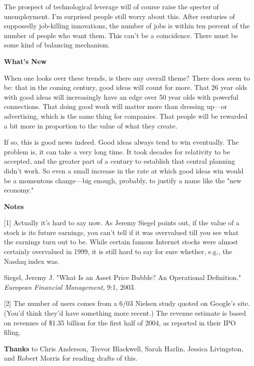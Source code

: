 The prospect of
                  technological leverage will of course raise the specter of
                  unemployment. I'm surprised people still worry about this.
                  After centuries of supposedly job-killing innovations, the
                  number of jobs is within ten percent of the number of people
                  who want them. This can't be a coincidence. There must be some
                  kind of balancing mechanism.

\textbf{What's New}

When one looks over these trends, is there any
                  overall theme? There does seem to be: that in the coming
                  century, good ideas will count for more. That 26 year olds
                  with good ideas will increasingly have an edge over 50 year
                  olds with powerful connections. That doing good work will
                  matter more than dressing up---or advertising, which is
                  the same thing for companies. That people will be rewarded a
                  bit more in proportion to the value of what they create.

If
                  so, this is good news indeed. Good ideas always tend to win
                  eventually. The problem is, it can take a very long time. It
                  took decades for relativity to be accepted, and the greater
                  part of a century to establish that central planning didn't
                  work. So even a small increase in the rate at which good ideas
                  win would be a momentous change---big enough, probably, to
                  justify a name like the "new economy."





\textbf{Notes}

[1] Actually it's hard to say now. As Jeremy
                  Siegel points out, if the value of a stock is its future
                  earnings, you can't tell if it was overvalued till you see
                  what the earnings turn out to be. While certain famous
                  Internet stocks were almost certainly overvalued in 1999, it
                  is still hard to say for sure whether, e.g., the Nasdaq index
                  was.

Siegel, Jeremy J. "What Is an Asset Price
                  Bubble? An Operational Definition."
                  \emph{European Financial Management,} 9:1, 2003.

[2]
                  The number of users comes from a 6/03 Nielsen study quoted on
                  Google's site. (You'd think they'd have something more
                  recent.) The revenue estimate is based on revenues of \$1.35
                  billion for the first half of 2004, as reported in their IPO
                  filing.

\textbf{Thanks} to Chris Anderson, Trevor
                  Blackwell, Sarah Harlin, Jessica Livingston, and Robert Morris
                  for reading drafts of this.



              
            
          
